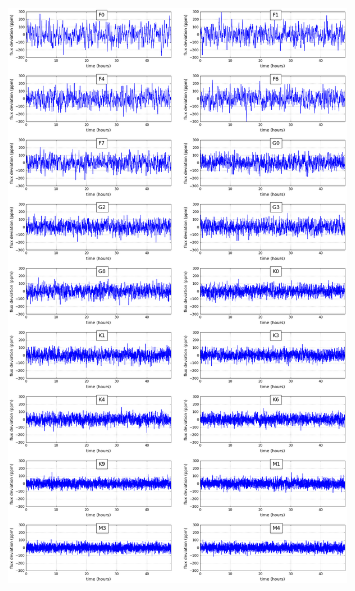 \documentclass[11pt]{article}      %
\begin{document}
\begin{figure}[hbtp]
  \begin{center}
    \ifpdf
    {\includegraphics[width=0.8\textwidth]{granulation_kallinger_Jul2018.png}}
    \else

\end{center}
\end{figure}
\end{document}
